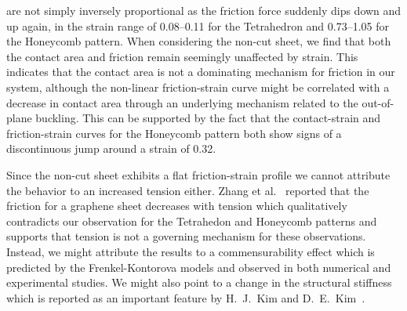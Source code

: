 are not simply inversely proportional as the friction force suddenly dips down
and up again, in the strain range of 0.08--0.11 for the Tetrahedron and
0.73--1.05 for the Honeycomb pattern. When considering the non-cut sheet, we
find that both the contact area and friction remain seemingly unaffected by
strain. This indicates that the contact area is not a dominating mechanism for
friction in our system, although the non-linear friction-strain curve might be
correlated with a decrease in contact area through an underlying mechanism
related to the out-of-plane buckling. This can be supported by the fact that the
contact-strain and friction-strain curves for the Honeycomb pattern both show
signs of a discontinuous jump around a strain of 0.32. 

Since the non-cut sheet
exhibits a flat friction-strain profile we cannot attribute the behavior to an
increased tension either. Zhang et al.~\cite{zhang_tuning_2019} reported that
the friction for a graphene sheet decreases with tension which qualitatively
contradicts our observation for the Tetrahedon and Honeycomb patterns and
supports that tension is not a governing mechanism for these observations.
Instead, we might attribute the results to a commensurability effect which is
predicted by the Frenkel-Kontorova models and observed in both numerical and
experimental studies. We might also point to a change in the structural
stiffness which is reported as an important feature by H.\ J.\ Kim and D.\ E.\
Kim~\cite{Kim_2012}. 


